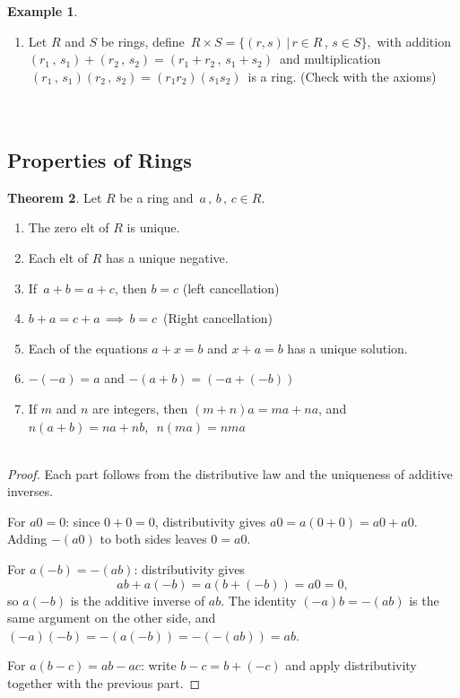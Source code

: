 \documentclass[11pt,a4paper]{article}
\theoremstyle{definition}
\newtheorem{thm}{Theorem}[subsection]
\newtheorem{exa}[thm]{Example}
\begin{document}
\begin{exa}
\begin{enumerate}
\item Let $R$ and $S$ be rings, define $\, R\times S = \big\{(r,s)\, \big|\, r\in R\, , \, s\in S\big\}, $ with addition\\ $(r_1\, , \, s_1) + (r_2\, ,\,s_2) = (r_1 + r_2\,, \, s_1 + s_2)\, $ and multiplication $\, (r_1\, ,\, s_1)(r_2\, ,\, s_2) = (r_1r_2)(s_1s_2)\,$ is a ring. (Check with the axioms)\\\\\
\end{enumerate}
\end{exa}















\subsection{Properties of Rings}


\begin{thm}
Let $R$ be a ring and $\, a\, , \, b\, , \, c\in R$.
\begin{enumerate}
\item The zero elt of $R$ is unique.
\item Each elt of $R$ has a unique negative.
\item If $\, a + b = a + c$, then $b = c$ (left cancellation)
\item $b + a = c + a\, \implies \, b = c\,$ (Right cancellation)
\item Each of the equations $a + x = b$ and $x + a  = b $ has a unique solution.
\item $-(-a) = a$ and $-(a + b) = (-a + (-b))$
\item If $m$ and $n$ are integers, then $(m + n) a = ma + na$, and $n(a+b) = na + nb$, $\, \, n(ma) = nma$\\\\
\end{enumerate}
\end{thm}

\begin{proof}
Each part follows from the distributive law and the uniqueness of additive
inverses.

For $a0 = 0$: since $0+0=0$, distributivity gives $a0 = a(0+0) = a0 + a0$.
Adding $-(a0)$ to both sides leaves $0 = a0$.

For $a(-b) = -(ab)$: distributivity gives
$$ab + a(-b) = a\left(b + (-b)\right) = a0 = 0,$$
so $a(-b)$ is the additive inverse of $ab$. The identity $(-a)b = -(ab)$ is the
same argument on the other side, and
$(-a)(-b) = -\left(a(-b)\right) = -\left(-(ab)\right) = ab$.

For $a(b-c) = ab-ac$: write $b-c = b+(-c)$ and apply distributivity together
with the previous part.
\end{proof}
\end{document}
